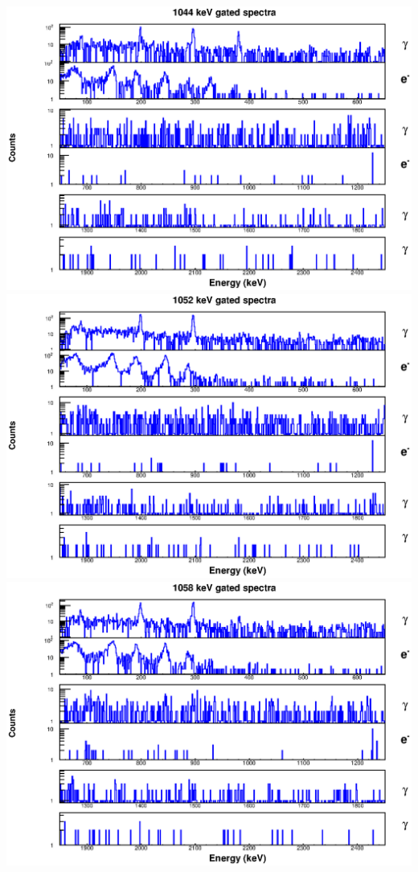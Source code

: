 \begin{landscape}
\includegraphics[scale=1.1]{156Gd_Appendix/1044_combined.eps}
\includegraphics[scale=1.1]{156Gd_Appendix/1052_combined.eps}
\includegraphics[scale=1.1]{156Gd_Appendix/1058_combined.eps}

\end{landscape}
